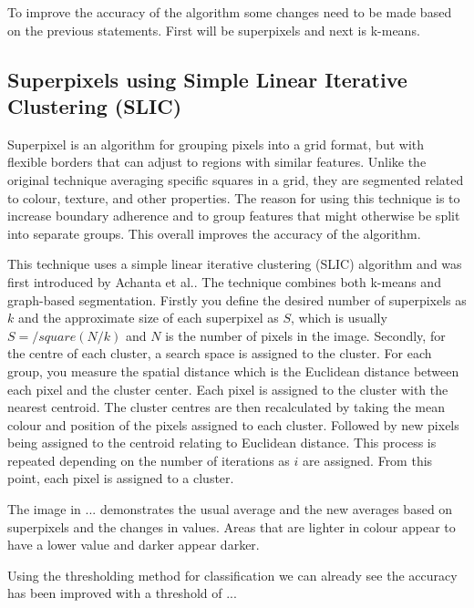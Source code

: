 To improve the accuracy of the algorithm some changes need to be made based on the previous statements. First will be superpixels and next is k-means.

\subsection{Superpixels using Simple Linear Iterative Clustering (SLIC)}
Superpixel is an algorithm for grouping pixels into a grid format, but with flexible borders that can adjust to regions with similar features. Unlike the original technique averaging specific squares in a grid\cite{Kasmi2016}, they are segmented related to colour, texture, and other properties. The reason for using this technique is to increase boundary adherence and to group features that might otherwise be split into separate groups. This overall improves the accuracy of the algorithm.

This technique uses a simple linear iterative clustering (SLIC) algorithm and was first introduced by Achanta et al.\cite{Achanta2012}. The technique combines both k-means and graph-based segmentation. Firstly you define the desired number of superpixels as $k$ and the approximate size of each superpixel as $S$, which is usually $S = /square(N/k)$ and $N$ is the number of pixels in the image. Secondly, for the centre of each cluster, a search space is assigned to the cluster. For each group, you measure the spatial distance which is the Euclidean distance between each pixel and the cluster center. Each pixel is assigned to the cluster with the nearest centroid. The cluster centres are then recalculated by taking the mean colour and position of the pixels assigned to each cluster. Followed by new pixels being assigned to the centroid relating to Euclidean distance. This process is repeated depending on the number of iterations as $i$ are assigned. From this point, each pixel is assigned to a cluster.

The image in ... demonstrates the usual average and the new averages based on superpixels and the changes in values. Areas that are lighter in colour appear to have a lower value and darker appear darker.

Using the thresholding method for classification we can already see the accuracy has been improved with a threshold of ...

